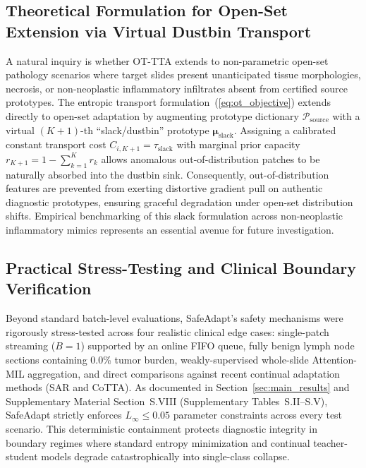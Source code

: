 \documentclass[journal]{IEEEtran}
\begin{document}
\subsection{Theoretical Formulation for Open-Set Extension via Virtual Dustbin Transport}
A natural inquiry is whether OT-TTA extends to non-parametric open-set pathology scenarios where target slides present unanticipated tissue morphologies, necrosis, or non-neoplastic inflammatory infiltrates absent from certified source prototypes. The entropic transport formulation~(\ref{eq:ot_objective}) extends directly to open-set adaptation by augmenting prototype dictionary $\mathcal{P}_{\text{source}}$ with a virtual $(K+1)$-th ``slack/dustbin'' prototype $\boldsymbol{\mu}_{\text{slack}}$. Assigning a calibrated constant transport cost $C_{i, K+1} = \tau_{\text{slack}}$ with marginal prior capacity $r_{K+1} = 1 - \sum_{k=1}^K r_k$ allows anomalous out-of-distribution patches to be naturally absorbed into the dustbin sink. Consequently, out-of-distribution features are prevented from exerting distortive gradient pull on authentic diagnostic prototypes, ensuring graceful degradation under open-set distribution shifts. Empirical benchmarking of this slack formulation across non-neoplastic inflammatory mimics represents an essential avenue for future investigation.

\subsection{Practical Stress-Testing and Clinical Boundary Verification}
Beyond standard batch-level evaluations, SafeAdapt's safety mechanisms were rigorously stress-tested across four realistic clinical edge cases: single-patch streaming ($B=1$) supported by an online FIFO queue, fully benign lymph node sections containing 0.0\% tumor burden, weakly-supervised whole-slide Attention-MIL aggregation, and direct comparisons against recent continual adaptation methods (SAR and CoTTA). As documented in Section~\ref{sec:main_results} and Supplementary Material Section~S.VIII (Supplementary Tables~S.II--S.V), SafeAdapt strictly enforces $L_\infty \le 0.05$ parameter constraints across every test scenario. This deterministic containment protects diagnostic integrity in boundary regimes where standard entropy minimization and continual teacher-student models degrade catastrophically into single-class collapse.
\end{document}
